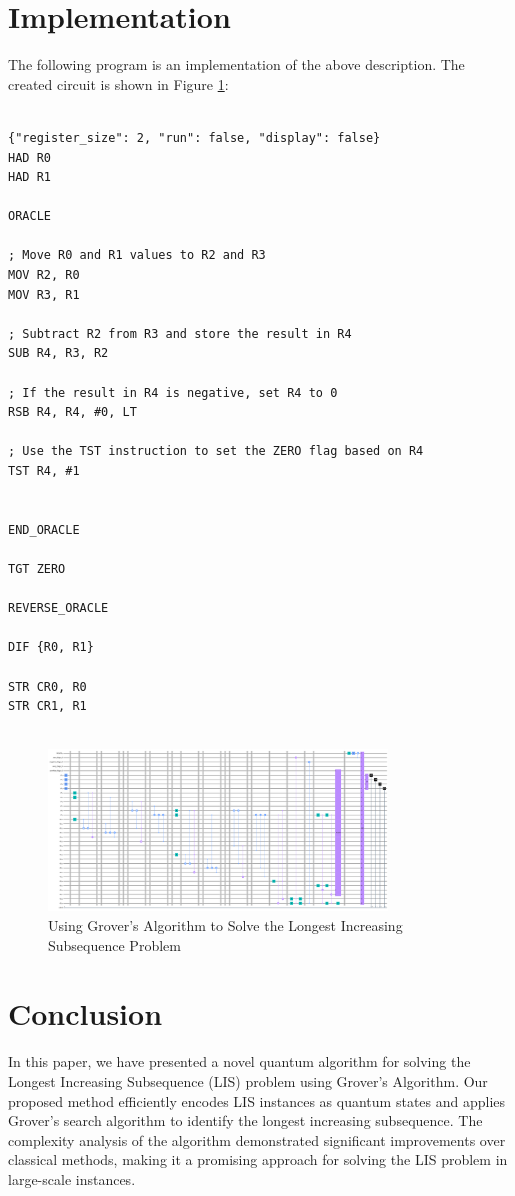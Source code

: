 \section{Implementation}

The following program is an implementation of the above description. The created circuit is shown in Figure \ref{fig:Longest_Increasing_Subsequence}:

\begin{lstlisting}

{"register_size": 2, "run": false, "display": false}
HAD R0
HAD R1

ORACLE

; Move R0 and R1 values to R2 and R3
MOV R2, R0
MOV R3, R1

; Subtract R2 from R3 and store the result in R4
SUB R4, R3, R2

; If the result in R4 is negative, set R4 to 0
RSB R4, R4, #0, LT

; Use the TST instruction to set the ZERO flag based on R4
TST R4, #1


END_ORACLE

TGT ZERO

REVERSE_ORACLE

DIF {R0, R1}

STR CR0, R0
STR CR1, R1


\end{lstlisting}

\begin{figure}[htp]
    \centering
    \includegraphics[width=9cm]{Figures/Longest_Increasing_Subsequence_circuit.png}
    \caption{Using Grover's Algorithm to Solve the Longest Increasing Subsequence Problem}
    \label{fig:Longest_Increasing_Subsequence}
\end{figure}

\section{Conclusion}
\label{sec:conclusion}

In this paper, we have presented a novel quantum algorithm for solving the Longest Increasing Subsequence (LIS) problem using Grover's Algorithm. Our proposed method efficiently encodes LIS instances as quantum states and applies Grover's search algorithm to identify the longest increasing subsequence. The complexity analysis of the algorithm demonstrated significant improvements over classical methods, making it a promising approach for solving the LIS problem in large-scale instances.

